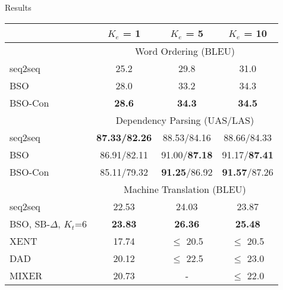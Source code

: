 \begin{frame}{Results}
  \vspace{-0.2cm}
  \begin{table}
  \centering
    \small
  \begin{tabular}{lccc}
    \toprule
    & $K_e$ = 1 & $K_e$ = 5 & $K_e$ = 10 \\ 
    \midrule
     & \multicolumn{3}{c}{Word Ordering (BLEU) } \\ 
    \midrule
    seq2seq & 25.2 & 29.8 & 31.0 \\
    BSO     & 28.0 & 33.2 & 34.3 \\
    BSO-Con & \textbf{28.6} & \textbf{34.3} & \textbf{34.5} \\
    \midrule


    & \multicolumn{3}{c}{Dependency Parsing (UAS/LAS) } \\ 
    seq2seq & \textbf{87.33/82.26} & 88.53/84.16 & 88.66/84.33\\
    BSO & 86.91/82.11 & 91.00/\textbf{87.18} & 91.17/\textbf{87.41} \\
    BSO-Con & 85.11/79.32 & \textbf{91.25}/86.92 & \textbf{91.57}/87.26 \\

    \midrule
    & \multicolumn{3}{c}{Machine Translation (BLEU) } \\ 
    seq2seq & 22.53 & 24.03 & 23.87 \\
    BSO, SB-$\Delta$, $K_t$=6 & \textbf{23.83} & \textbf{26.36} & \textbf{25.48} \\
    XENT & 17.74 & $\leq$ 20.5 & $\leq$ 20.5 \\
    DAD & 20.12 & $\leq$ 22.5 & $\leq$ 23.0 \\ 
    MIXER & 20.73 & - & $\leq$ 22.0 \\    
    \bottomrule
  \end{tabular}
  \label{tab:mtfinal}
\end{table}

\end{frame}


